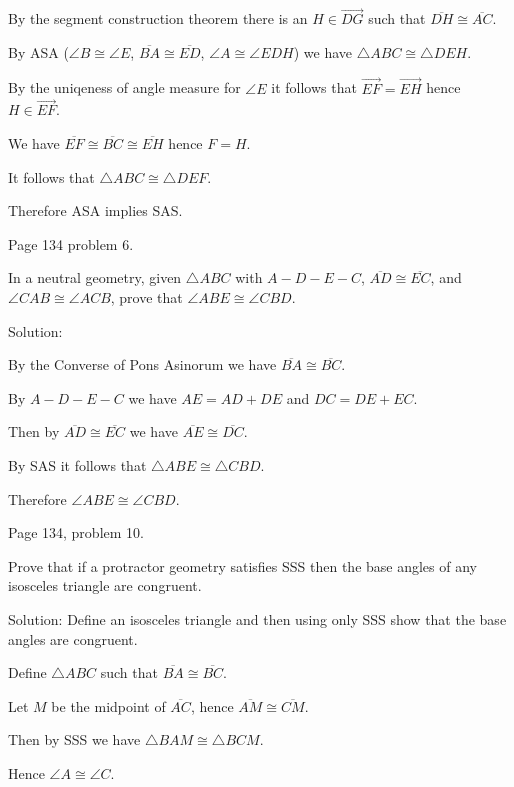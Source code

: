 \medskip
By the segment construction theorem there is an $H\in\overrightarrow{DG}$
such that $\overline{DH}\cong\overline{AC}$.

\medskip
By ASA ($\angle B\cong\angle E$, $\overline{BA}\cong\overline{ED}$,
$\angle A\cong\angle EDH$) we have $\triangle ABC\cong\triangle DEH$.

\medskip
By the uniqeness of angle measure for $\angle E$
it follows that $\overrightarrow{EF}=\overrightarrow{EH}$ hence $H\in\overrightarrow{EF}$.

\medskip
We have $\overline{EF}\cong\overline{BC}\cong\overline{EH}$ hence $F=H$.

\medskip
It follows that $\triangle ABC\cong\triangle DEF$.

\medskip
Therefore ASA implies SAS.

\beginsection Page 134 problem 6.

In a neutral geometry, given $\triangle ABC$ with $A{-}D{-}E{-}C$,
$\overline{AD}\cong\overline{EC}$, and $\angle CAB\cong\angle ACB$,
prove that $\angle ABE\cong\angle CBD$.

\bigskip
\noindent
Solution:

\medskip
By the Converse of Pons Asinorum we have $\overline{BA}\cong\overline{BC}$.

\medskip
By $A{-}D{-}E{-}C$ we have $AE=AD+DE$ and $DC=DE+EC$.

\medskip
Then by $\overline{AD}\cong\overline{EC}$ we have $\overline{AE}\cong\overline{DC}$.

\medskip
By SAS it follows that $\triangle ABE\cong\triangle CBD$.

\medskip
Therefore $\angle ABE\cong\angle CBD$.

\beginsection Page 134, problem 10.

Prove that if a protractor geometry satisfies SSS then the base angles of any
isosceles triangle are congruent.

\bigskip
\noindent
Solution: Define an isosceles triangle and then using only SSS show that
the base angles are congruent.

\medskip
Define $\triangle ABC$ such that $\overline{BA}\cong\overline{BC}$.

\medskip
Let $M$ be the midpoint of $\overline{AC}$, hence $\overline{AM}\cong\overline{CM}$.

\medskip
Then by SSS we have $\triangle BAM\cong\triangle BCM$.

\medskip
Hence $\angle A\cong\angle C$.


